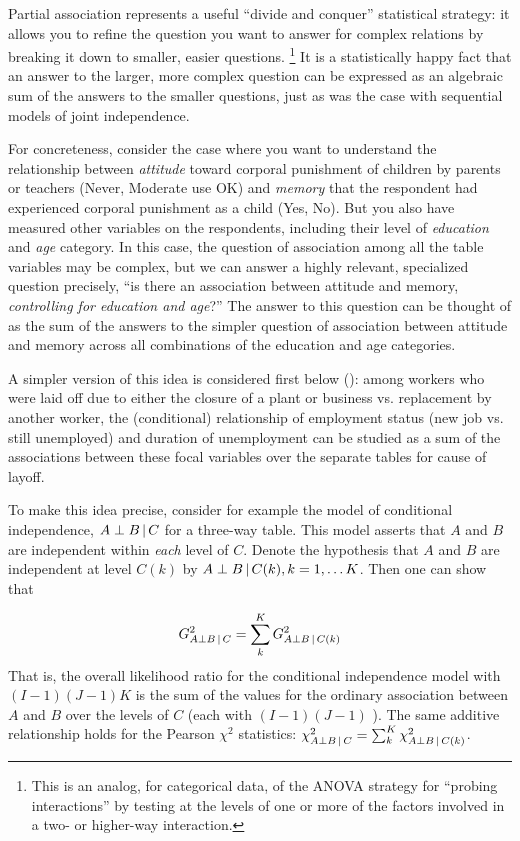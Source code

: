 \documentclass[10pt,krantz2]{krantz}\usepackage[]{graphicx}\usepackage[]{color}
\begin{document}
Partial association represents a useful ``divide and conquer'' statistical strategy:
it allows you to refine the question you want to answer for complex relations
by breaking it down to smaller, easier questions.%
\footnote{
This is an analog, for categorical data, of the ANOVA strategy for ``probing interactions''
by testing  at the levels of one or more of the
factors involved in a two- or higher-way interaction.
}
It is a statistically
happy fact that an answer to the larger, more complex question
can be expressed as an algebraic sum of the answers to the smaller questions,
just as was the case with sequential models of joint independence.

For concreteness, consider the case where you want to understand the
relationship between \emph{attitude} toward corporal punishment of children
by parents or teachers (Never, Moderate use OK) and \emph{memory}
that the respondent had experienced corporal punishment as a child (Yes, No).
But you also have measured other variables on the respondents, including their
level of \emph{education} and \emph{age} category.  In this case, the
question of association among all the table variables may be complex,
but we can answer a highly relevant, specialized question
precisely,
``is there an association between attitude and memory,
\emph{controlling for education and age}?''
The answer to this question can be thought of as the sum of the
answers to the simpler question of association between attitude and memory
across all combinations of the education and age categories.

A simpler version of this idea is considered first below ():
among workers who were laid off
due to either the closure of a plant or business vs.
replacement by another worker,
the (conditional)
relationship of employment status (new job vs. still unemployed)
and duration of unemployment can be studied as a sum of the
associations between these focal variables over the separate tables
for cause of layoff.

To make this idea precise, consider for example the model of conditional independence, $A\perp B\, | \, C$
for a three-way table. This model asserts that $A$ and $B$ are independent
within \textit{each} level of $C$. Denote the hypothesis that $A$ and $B$
are independent at level $C(k)$ by $A\perp B\, | \, C(k), k=1, \dots K$. Then one can show
\citep{Andersen:91} that

\begin{equation}\label{eq:partial1}
G_{A\perp B\given C}^2=\sum_k^K G_{A\perp B\given C(k)}^2
\end{equation}
That is, the overall likelihood ratio \GSQ for the conditional independence model
with $(I-1)(J-1)K$ \df{} is the
sum of the values for the ordinary association between $A$ and $B$ over the levels of
$C$ (each with $(I-1)(J-1)$ \df{}). The same additive relationship holds for the
Pearson $\chi^2$ statistics: $\chi^2_{A\perp B\, | \, C}=\sum_k^K \chi^2_{A\perp B\, | \, C(k)}$.
\end{document}
